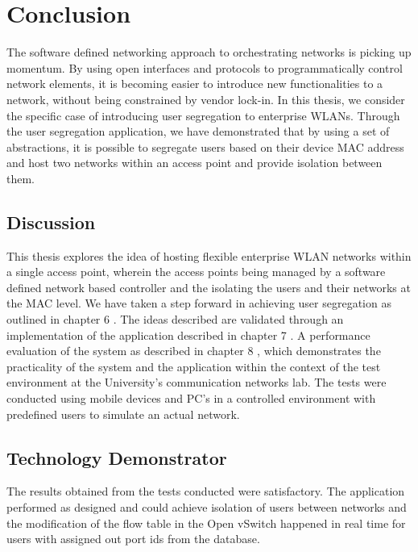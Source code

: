 \chapter{Conclusion}
The software defined networking approach to orchestrating networks is picking up momentum. By using open interfaces and protocols to programmatically control network elements, it is becoming easier to introduce new functionalities to a network, without being constrained by vendor lock-in. In this thesis, we consider the specific case of introducing user segregation to enterprise WLANs. Through the user segregation application, we have demonstrated that by using a set of abstractions, it is possible to segregate users based on their device MAC address and host two networks within an access point and provide isolation between them.

\section{Discussion}
This thesis explores the idea of hosting flexible enterprise WLAN networks within a single access point, wherein the access points being managed by a software defined network based controller and the isolating the users and their networks at the MAC level. We have taken a step forward in achieving user segregation as outlined in chapter 6 . The ideas described are validated through an implementation of the application described in chapter 7 . A performance evaluation of the system as described in chapter 8 , which demonstrates the practicality of the system and the application within the context of the test environment at the University’s communication networks lab. The tests were conducted using mobile devices and PC’s in a controlled environment with predefined users to simulate an actual network.

\section{Technology Demonstrator}
The results obtained from the tests conducted were satisfactory. The application performed as designed and could achieve isolation of users between networks and the modification of the flow table in the Open vSwitch happened in real time for users with assigned out port ids from the database. 

